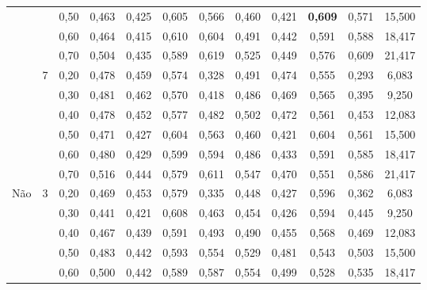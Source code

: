 \begin{table}[!h]
\begin{tabular}{|c|c|c||c|c|c|c||c|c|c|c||c|}
	 && 0,50    & 0,463 & 0,425 & 0,605 & 0,566         &     0,460 &  0,421 & \cellcolor{gray!20} \textbf{0,609} & 0,571 & 15,500  \\ \cline{3-12} 
	 && 0,60    & 0,464 & 0,415 & 0,610 & 0,604         &     0,491 &  0,442 & 0,591 & 0,588 & 18,417              \\ \cline{3-12}                  
	 && 0,70    & 0,504 & 0,435 & 0,589 & 0,619         &     0,525 &  0,449 & 0,576 & 0,609 & 21,417              \\ \cline{2-12}                  
 & \multirow{6}{*}{7}                                                                                                                               
	  & 0,20    & 0,478 & 0,459 & 0,574 & 0,328         &     0,491 &  0,474 & 0,555 & 0,293 & 6,083               \\ \cline{3-12}                  
	 && 0,30    & 0,481 & 0,462 & 0,570 & 0,418         &     0,486 &  0,469 & 0,565 & 0,395 & 9,250               \\ \cline{3-12}                  
	 && 0,40    & 0,478 & 0,452 & 0,577 & 0,482         &     0,502 &  0,472 & 0,561 & 0,453 & 12,083              \\ \cline{3-12}                  
	 && 0,50    & 0,471 & 0,427 & 0,604 & 0,563         &     0,460 &  0,421 & 0,604 & 0,561 & 15,500              \\ \cline{3-12}                  
	 && 0,60    & 0,480 & 0,429 & 0,599 & 0,594         &     0,486 &  0,433 & 0,591 & 0,585 & 18,417              \\ \cline{3-12}                  
	 && 0,70    & 0,516 & 0,444 & 0,579 & 0,611         &     0,547 &  0,470 & 0,551 & 0,586 & 21,417              \\ \hline                       
\multirow{18}{*}{Não} & \multirow{6}{*}{3} 
	  & 0,20    & 0,469 & 0,453 & 0,579 & 0,335         &     0,448 &  0,427 & 0,596 & 0,362 & 6,083               \\ \cline{3-12}  
	 && 0,30    & 0,441 & 0,421 & 0,608 & 0,463         &     0,454 &  0,426 & 0,594 & 0,445 & 9,250               \\ \cline{3-12}  
	 && 0,40    & 0,467 & 0,439 & 0,591 & 0,493         &     0,490 &  0,455 & 0,568 & 0,469 & 12,083              \\ \cline{3-12}  
	 && 0,50    & 0,483 & 0,442 & 0,593 & 0,554         &     0,529 &  0,481 & 0,543 & 0,503 & 15,500              \\ \cline{3-12}  
	 && 0,60    & 0,500 & 0,442 & 0,589 & 0,587         &     0,554 &  0,499 & 0,528 & 0,535 & 18,417              \\ \cline{3-12}  

\end{tabular}
\end{table}
